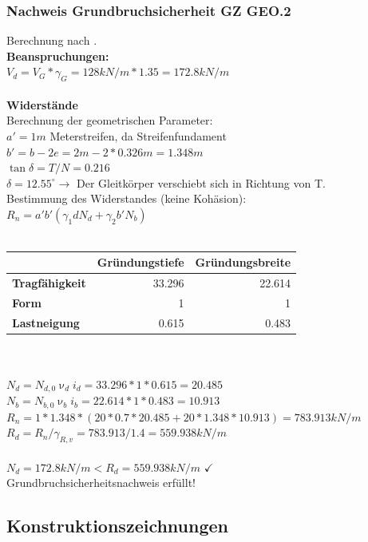 \documentclass[11pt,fleqn,a4paper]{article}
\begin{document}
\subsubsection{Nachweis Grundbruchsicherheit GZ GEO.2}
Berechnung nach \cite[S.99]{wsp}. \\
\textbf{Beanspruchungen:}\\
$V_d = V_G*\gamma_G = 128kN/m * 1.35 = 172.8kN/m$ \\
\\
\textbf{Widerstände}\\
Berechnung der geometrischen Parameter: \\
$ a' = 1m$ Meterstreifen, da Streifenfundament \\
$ b' = b - 2e = 2m - 2*0.326m = 1.348m$ \\
$ \tan\delta = T/N = 0.216 $ \\
$ \delta = 12.55^\circ \rightarrow$ Der Gleitkörper verschiebt sich in Richtung von T. 
\\
Bestimmung des Widerstandes (keine Kohäsion): \\
$R_n = a'b' (\gamma_1 d N_d + \gamma_2 b' N_b)$\\
\\
\begin{tabular}{|l|r|r|}
\hline
 & \multicolumn{1}{l|}{\textbf{Gründungstiefe}} & \multicolumn{1}{l|}{\textbf{Gründungsbreite}} \\ \hline
\textbf{Tragfähigkeit} & 33.296 & 22.614 \\ \hline
\textbf{Form} & 1 & 1 \\ \hline
\textbf{Lastneigung} & 0.615 & 0.483 \\ \hline
\end{tabular}\\
\\
$ N_d = N_{d,0} \upnu_d i_d = 33.296 * 1 * 0.615 = 20.485$ \\
$ N_b = N_{b,0} \upnu_b i_b = 22.614 * 1 * 0.483 = 10.913$ \\
$ R_n = 1 * 1.348 * (20 * 0.7 * 20.485 + 20 * 1.348 * 10.913) = 783.913kN/m$\\
$R_d = R_n/\gamma_{R,v} = 783.913 / 1.4 = 559.938kN/m$ \\
\\
$N_d = 172.8kN/m < R_d = 559.938kN/m$ $\checkmark$ \\
Grundbruchsicherheitsnachweis erfüllt!
\subsection{Konstruktionszeichnungen}
\end{document}
